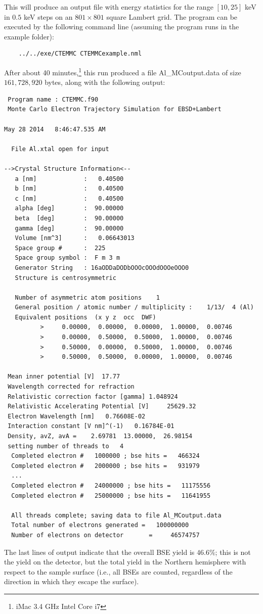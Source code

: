 \documentclass[DIV=calc, paper=letter, fontsize=11pt]{scrartcl}	 %
\begin{document}
This will produce an output file with energy statistics for the range $[10,25]$ keV in $0.5$ keV steps
on an $801\times 801$ square Lambert grid.  The program can be executed by the following command line
(assuming the program runs in the example folder):
\begin{verbatim}
	../../exe/CTEMMC CTEMMCexample.nml
\end{verbatim}
After about 40 minutes,\footnote{iMac 3.4 GHz Intel Core i7} 
this run produced a file \textsf{Al\_MCoutput.data} of size $161,728,920$ bytes, along with the following output:
\begin{verbatim}
 Program name : CTEMMC.f90
 Monte Carlo Electron Trajectory Simulation for EBSD+Lambert

May 28 2014   8:46:47.535 AM

  File Al.xtal open for input

-->Crystal Structure Information<--
   a [nm]             :   0.40500
   b [nm]             :   0.40500
   c [nm]             :   0.40500
   alpha [deg]        :  90.00000
   beta  [deg]        :  90.00000
   gamma [deg]        :  90.00000
   Volume [nm^3]      :   0.06643013
   Space group #      :  225
   Space group symbol :  F m 3 m
   Generator String   : 16aODDaDODbOOOcOOOdOOOeOOO0
   Structure is centrosymmetric

   Number of asymmetric atom positions    1
   General position / atomic number / multiplicity :    1/13/  4 (Al)
   Equivalent positions  (x y z  occ  DWF)
          >     0.00000,  0.00000,  0.00000,  1.00000,  0.00746
          >     0.00000,  0.50000,  0.50000,  1.00000,  0.00746
          >     0.50000,  0.00000,  0.50000,  1.00000,  0.00746
          >     0.50000,  0.50000,  0.00000,  1.00000,  0.00746

 Mean inner potential [V]  17.77
 Wavelength corrected for refraction
 Relativistic correction factor [gamma] 1.048924
 Relativistic Accelerating Potential [V]     25629.32
 Electron Wavelength [nm]   0.76608E-02
 Interaction constant [V nm]^(-1)   0.16784E-01
 Density, avZ, avA =    2.69781  13.00000,  26.98154
 setting number of threads to   4
  Completed electron #   1000000 ; bse hits =   466324
  Completed electron #   2000000 ; bse hits =   931979
  ...
  Completed electron #   24000000 ; bse hits =   11175556
  Completed electron #   25000000 ; bse hits =   11641955
  
  All threads complete; saving data to file Al_MCoutput.data
  Total number of electrons generated =   100000000
  Number of electrons on detector       =     46574757
\end{verbatim}
The last lines of output indicate that the overall BSE yield is $46.6\%$; this is not the 
yield on the detector, but the total yield in the Northern hemisphere with respect to the 
sample surface (i.e., all BSEs are counted, regardless of the direction in which they
escape the surface).
\end{document}
